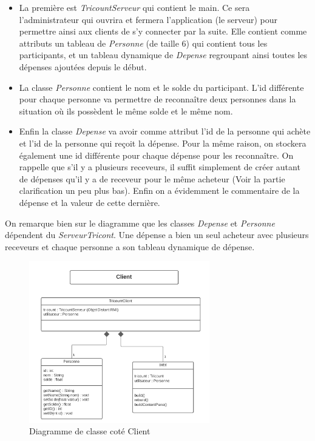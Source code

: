 \documentclass[12,french]{report}
\begin{document}
\begin{itemize}[label=\textbullet]
\item La première est \textit{TricountServeur} qui contient le main. Ce sera l’administrateur qui ouvrira et fermera l’application (le serveur) pour permettre ainsi aux clients de s’y connecter par la suite. Elle contient comme attributs un tableau de \textit{Personne} (de taille 6) qui contient tous les participants, et un tableau dynamique de \textit{Depense} regroupant ainsi toutes les dépenses ajoutées depuis le début.\\

\item La classe \textit{Personne} contient le nom et le solde du participant. L’id différente pour chaque personne va permettre de reconnaître deux personnes dans la situation où ils possèdent le même solde et le même nom.\\

\item Enfin la classe \textit{Depense} va avoir comme attribut l’id de la personne qui achète et l’id de la personne qui reçoit la dépense. Pour la même raison, on stockera également une id différente pour chaque dépense pour les reconnaître. On rappelle que s’il y a plusieurs receveurs, il suffit simplement de créer autant de dépenses qu’il y a de receveur pour le même acheteur (Voir la partie clarification un peu plus bas). Enfin on a évidemment le commentaire de la dépense et la valeur de cette dernière.\\
\end{itemize}

On remarque bien sur le diagramme que les classes \textit{Depense} et \textit{Personne} dépendent du \textit{ServeurTricont}. Une dépense a bien un seul acheteur avec plusieurs receveurs et chaque personne a son tableau dynamique de dépense.\\

\begin{figure}[H]
	\center
	\includegraphics[width=0.7\textwidth]{./Images_pooa/Diagramme_de_classe_Client}
	\caption{Diagramme de classe coté Client}
\end{figure}\vspace{0.2cm}
\end{document}

